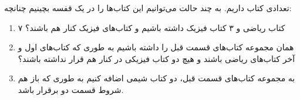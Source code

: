 \p
تعدادی کتاب داریم. به چند حالت می‌توانیم این کتاب‌ها را در یک قفسه بچینیم چنانچه:
\begin{enumerate}
  \item 
    ۷ کتاب ریاضی و ۳ کتاب فیزیک داشته باشیم و کتاب‌های فیزیک کنار هم باشند؟

  \item
    همان مجموعه کتاب‌های قسمت قبل را داشته باشیم به طوری که کتاب‌های اول و آخر کتاب‌های ریاضی باشند و هیچ دو کتاب فیزیکی در کنار هم قرار نداشته باشند؟

  \item 
    به مجموعه‌ کتاب‌های قسمت قبل، دو کتاب شیمی اضافه کنیم به طوری که باز هم شروط قسمت دو برقرار باشد.
\end{enumerate}